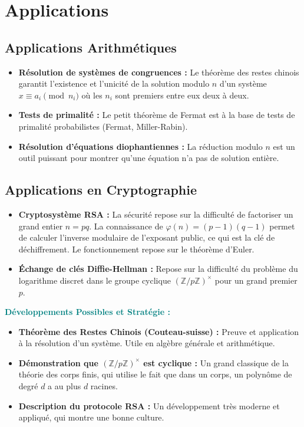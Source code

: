 \documentclass[12pt, a4paper, parskip=full]{report}
\theoremstyle{agregstyle}
\newenvironment{developpements}
  {\par\medskip\noindent\begin{oframed}\noindent\textbf{\textcolor{teal}{Développements Possibles et Stratégie :}}}
  {\end{oframed}\par\medskip}
\begin{document}
\section{Applications}

\subsection{Applications Arithmétiques}
\begin{itemize}
    \item \textbf{Résolution de systèmes de congruences :} Le théorème des restes chinois garantit l'existence et l'unicité de la solution modulo $n$ d'un système $x \equiv a_i \pmod{n_i}$ où les $n_i$ sont premiers entre eux deux à deux.
    \item \textbf{Tests de primalité :} Le petit théorème de Fermat est à la base de tests de primalité probabilistes (Fermat, Miller-Rabin).
    \item \textbf{Résolution d'équations diophantiennes :} La réduction modulo $n$ est un outil puissant pour montrer qu'une équation n'a pas de solution entière.
\end{itemize}

\subsection{Applications en Cryptographie}
\begin{itemize}
    \item \textbf{Cryptosystème RSA :} La sécurité repose sur la difficulté de factoriser un grand entier $n=pq$. La connaissance de $\varphi(n)=(p-1)(q-1)$ permet de calculer l'inverse modulaire de l'exposant public, ce qui est la clé de déchiffrement. Le fonctionnement repose sur le théorème d'Euler.
    \item \textbf{Échange de clés Diffie-Hellman :} Repose sur la difficulté du problème du logarithme discret dans le groupe cyclique $(\mathbb{Z}/p\mathbb{Z})^\times$ pour un grand premier $p$.
\end{itemize}

\begin{developpements}
    \begin{itemize}
        \item \textbf{Théorème des Restes Chinois (Couteau-suisse) :} Preuve et application à la résolution d'un système. Utile en algèbre générale et arithmétique.
        \item \textbf{Démonstration que $(\mathbb{Z}/p\mathbb{Z})^\times$ est cyclique :} Un grand classique de la théorie des corps finis, qui utilise le fait que dans un corps, un polynôme de degré $d$ a au plus $d$ racines.
        \item \textbf{Description du protocole RSA :} Un développement très moderne et appliqué, qui montre une bonne culture.
    \end{itemize}
\end{developpements}
\end{document}

